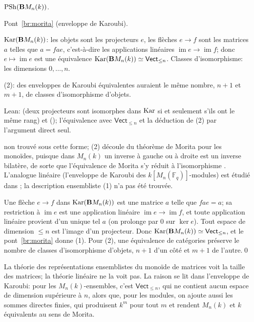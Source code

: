 \begin{trace}
\item[tablier] $\mathrm{PSh}(\mathbf{B} M_n(k))$.
\item[arche] Pont~\ref{br:morita} (enveloppe de Karoubi).
\item[spécialiser] $\operatorname{Kar}(\mathbf{B} M_n(k))$: les objets sont les projecteurs $e$, les flèches $e\to f$ sont les matrices $a$ telles que $a = fae$, c'est-à-dire les applications linéaires $\operatorname{im}e\to\operatorname{im}f$; donc $e\mapsto\operatorname{im}e$ est une équivalence $\operatorname{Kar}(\mathbf{B} M_n(k))\simeq\mathsf{Vect}_{\le n}$. Classes d'isomorphisme: les dimensions $0,\dots,n$.
\item[réécrire] (2): des enveloppes de Karoubi équivalentes auraient le même nombre, $n+1$ et $m+1$, de classes d'isomorphisme d'objets.
\item[vérifier] Lean:  (deux projecteurs sont isomorphes dans $\operatorname{Kar}$ si et seulement s'ils ont le même rang) et  (); l'équivalence avec $\mathsf{Vect}_{\le n}$ et la déduction de (2) par l'argument direct seul.
\item[nouveauté] non trouvé sous cette forme; (2) découle du théorème de Morita pour les monoïdes, puisque dans $M_n(k)$ un inverse à gauche ou à droite est un inverse bilatère, de sorte que l'équivalence de Morita s'y réduit à l'isomorphisme \cite[Cor.~1.6.2]{rogers-thesis}. L'analogue linéaire (l'enveloppe de Karoubi des $k[M_n(\mathbb F_q)]$-modules) est étudié dans \cite{kuhn}; la description ensembliste (1) n'a pas été trouvée.
\end{trace}

\direct{} Une flèche $e\to f$ dans $\operatorname{Kar}(\mathbf{B} M_n(k))$ est une matrice $a$ telle que $fae = a$; sa restriction à $\operatorname{im}e$ est une application linéaire $\operatorname{im}e\to\operatorname{im}f$, et toute application linéaire provient d'un unique tel $a$ (on prolonge par $0$ sur $\ker e$). Tout espace de dimension $\le n$ est l'image d'un projecteur. Donc $\operatorname{Kar}(\mathbf{B} M_n(k))\simeq\mathsf{Vect}_{\le n}$, et le pont~\ref{br:morita} donne (1). Pour (2), une équivalence de catégories préserve le nombre de classes d'isomorphisme d'objets, $n+1$ d'un côté et $m+1$ de l'autre.\qed

\inwords{} La théorie des représentations ensemblistes du monoïde de matrices voit la taille des matrices; la théorie linéaire ne la voit pas. La raison se lit dans l'enveloppe de Karoubi: pour les $M_n(k)$-ensembles, c'est $\mathsf{Vect}_{\le n}$, qui ne contient aucun espace de dimension supérieure à $n$, alors que, pour les modules, on ajoute aussi les sommes directes finies, qui produisent $k^m$ pour tout $m$ et rendent $M_n(k)$ et $k$ équivalents au sens de Morita.

